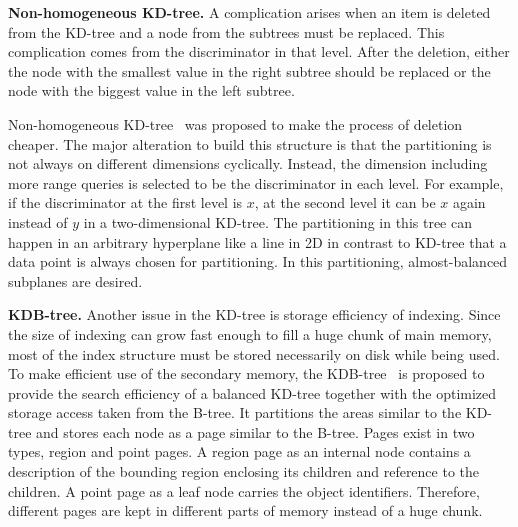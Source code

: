 \documentclass[a4paper,12pt]{article}
\begin{document}
\textbf{Non-homogeneous KD-tree.}
A complication arises when an item is deleted from the KD-tree and a node from the subtrees must be replaced. This complication comes from the discriminator in that level. After the deletion, either the node with the smallest value in the right subtree should be replaced or the node with the biggest value in the left subtree. 

Non-homogeneous KD-tree~\cite{nonhomkdtree} was proposed to make the process of deletion cheaper. The major alteration to build this structure is that the partitioning is not always on different dimensions cyclically. Instead, the dimension including more range queries is selected to be the discriminator in each level. For example, if the discriminator at the first level is $x$, at the second level it can be $x$ again instead of $y$ in a two-dimensional KD-tree. 
The partitioning in this tree can happen in an arbitrary hyperplane like a line in 2D in contrast to KD-tree that a data point is always chosen for partitioning. In this partitioning, almost-balanced subplanes are desired.
 
\textbf{KDB-tree.} Another issue in the KD-tree is storage efficiency of indexing.
Since the size of indexing can grow fast enough to fill a huge chunk of main memory, most of the index structure must be stored necessarily on disk while being used.
To make efficient use of the secondary memory, the KDB-tree~\cite{kdbtree} is proposed to provide the search efficiency of a balanced KD-tree together with the optimized storage access taken from the B-tree. It partitions the areas similar to the KD-tree and stores each node as a page similar to the B-tree. Pages exist in two types, 
region and point pages. A region page as an internal node contains a description of the bounding region enclosing its children and reference to the children. 
A point page as a leaf node carries the object identifiers. Therefore, different pages are kept in different parts of memory instead of a huge chunk. 
\end{document}
